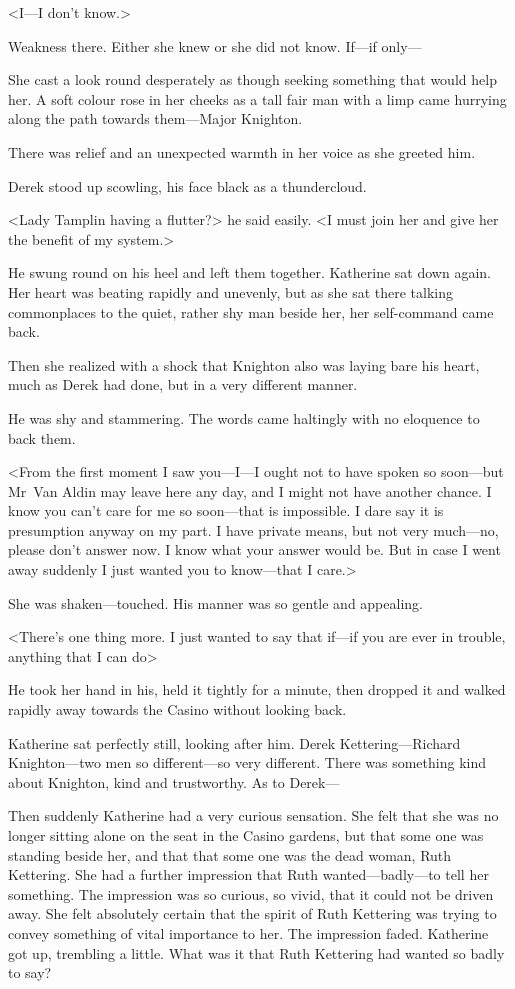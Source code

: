 <I—I don't know.>

Weakness there. Either she knew or she did not know. If—if only—

She cast a look round desperately as though seeking something that would help her. A soft colour rose in her cheeks as a tall fair man with a limp came hurrying along the path towards them—Major Knighton.

There was relief and an unexpected warmth in her voice as she greeted him.

Derek stood up scowling, his face black as a thundercloud.

<Lady Tamplin having a flutter?> he said easily. <I must join her and give her the benefit of my system.>

He swung round on his heel and left them together. Katherine sat down again. Her heart was beating rapidly and unevenly, but as she sat there talking commonplaces to the quiet, rather shy man beside her, her self-command came back.

Then she realized with a shock that Knighton also was laying bare his heart, much as Derek had done, but in a very different manner.

He was shy and stammering. The words came haltingly with no eloquence to back them.

<From the first moment I saw you—I—I ought not to have spoken so soon—but Mr~Van Aldin may leave here any day, and I might not have another chance. I know you can't care for me so soon—that is impossible. I dare say it is presumption anyway on my part. I have private means, but not very much—no, please don't answer now. I know what your answer would be. But in case I went away suddenly I just wanted you to know—that I care.>

She was shaken—touched. His manner was so gentle and appealing.

<There's one thing more. I just wanted to say that if—if you are ever in trouble, anything that I can do\longdash>

He took her hand in his, held it tightly for a minute, then dropped it and walked rapidly away towards the Casino without looking back.

Katherine sat perfectly still, looking after him. Derek Kettering—Richard Knighton—two men so different—so very different. There was something kind about Knighton, kind and trustworthy. As to Derek—

Then suddenly Katherine had a very curious sensation. She felt that she was no longer sitting alone on the seat in the Casino gardens, but that some one was standing beside her, and that that some one was the dead woman, Ruth Kettering. She had a further impression that Ruth wanted—badly—to tell her something. The impression was so curious, so vivid, that it could not be driven away. She felt absolutely certain that the spirit of Ruth Kettering was trying to convey something of vital importance to her. The impression faded. Katherine got up, trembling a little. What was it that Ruth Kettering had wanted so badly to say?